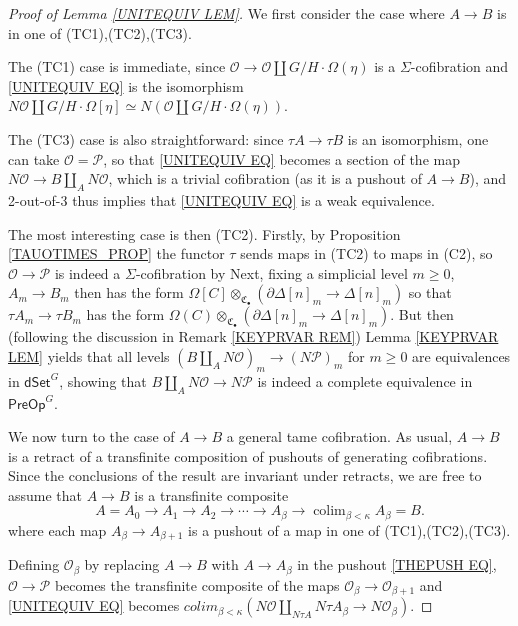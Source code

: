 \documentclass[a4paper,10pt]{article}%
\numberwithin{equation}{section}
\numberwithin{figure}{section}
\theoremstyle{definition} %
\DeclareMathOperator{\colim}{colim}%
\renewcommand{\O}{\ensuremath{\mathcal O}}
\renewcommand{\P}{\ensuremath{\mathcal P}}
\newcommand{\1}{\ensuremath{\mathbbm 1}}%
\begin{document}
\begin{proof}[Proof of Lemma \ref{UNITEQUIV LEM}]
	We first consider the case where $A\to B$ is in one of (TC1),(TC2),(TC3).
	
	The (TC1) case is immediate, 
	since $\mathcal{O} \to \mathcal{O} \amalg G/H \cdot \Omega(\eta)$ is a $\Sigma$-cofibration and
	\eqref{UNITEQUIV EQ}
	is the isomorphism
	$N\mathcal{O} \amalg G/H\cdot \Omega[\eta] \simeq 
	N\left( \mathcal{O} \amalg G/H \cdot \Omega(\eta) \right)$.
	
	The (TC3) case is also straightforward:
	since $\tau A \to \tau B$ is an isomorphism, one can take 
	$\mathcal{O}=\mathcal{P}$, so that 
	\eqref{UNITEQUIV EQ}
	becomes a section of the map
	$N \mathcal{O} \to B \amalg_{A} N \mathcal{O}$, which is a trivial cofibration (as it is a pushout of $A \to B$),
	and 2-out-of-3 thus implies that \eqref{UNITEQUIV EQ} is a weak equivalence.

	The most interesting case is then (TC2).
	Firstly, by Proposition \ref{TAUOTIMES_PROP} the functor $\tau$ sends maps in (TC2) to maps in (C2), 
	so $\O \to \P$ is indeed a $\Sigma$-cofibration
	by \cite[Prop. 3.63]{BP_HGOP} %
	Next, fixing a simplicial level $m\geq 0$,
	$A_m \to B_m$ then has the form
	$\Omega[C] \otimes_{\mathfrak{C}_{\bullet}} \left(\partial \Delta[n]_m \to \Delta[n]_m\right)$ so that
	$\tau A_m \to \tau B_m$ has the form
	$\Omega(C) \otimes_{\mathfrak{C}_{\bullet}} \left(\partial \Delta[n]_m \to \Delta[n]_m\right)$.
	But then (following the discussion in 
	Remark \ref{KEYPRVAR REM})
	Lemma \ref{KEYPRVAR LEM}
	yields that all levels
	$(B \amalg_{A} N \mathcal{O})_m
	\to 
	(N \mathcal{P})_m$
	for $m \geq 0$
	are equivalences in $\mathsf{dSet}^G$,
	showing that 
	$B \amalg_{A} N \mathcal{O}
	\to 
	N \mathcal{P}$
	is indeed a complete equivalence in
	$\mathsf{PreOp}^G$.

	We now turn to the case of $A \to B$ a general tame cofibration.
	As usual, $A \to B$ is a retract of a transfinite composition of pushouts of generating cofibrations.
	Since the conclusions of the result are invariant under retracts,
	we are free to assume that $A \to B$ is a transfinite composite
	\[
	A = A_0 \to A_1 \to A_2 \to \cdots \to A_{\beta} \to 
	\colim_{\beta < \kappa} A_{\beta} = B.
	\]
	where each map $A_{\beta} \to A_{\beta +1}$ is a pushout of a map in one of (TC1),(TC2),(TC3).

	Defining $\mathcal{O}_{\beta}$ by replacing $A \to B$ with $A \to A_{\beta}$ in the pushout \eqref{THEPUSH EQ},
	$\mathcal{O} \to \mathcal{P}$ becomes the transfinite composite of the maps $\mathcal{O}_{\beta} \to \mathcal{O}_{\beta + 1}$
	and \eqref{UNITEQUIV EQ} becomes
	$
	colim_{\beta < \kappa} \left( 
	N \mathcal{O} \amalg_{N \tau A} N \tau A_{\beta}
	\to 
	N \mathcal{O}_{\beta}
	\right)
	$.


\end{proof}
\end{document}
